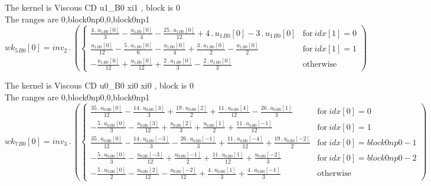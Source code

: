 \documentclass{article}
\begin{document}
\noindent The kernel is Viscous CD u1_B0 xi1 , block is 0\\\noindent The ranges are 0,block0np0,0,block0np1\\\begin{dmath}{wk_{5}{_{B0}}}[{0}] = inv_2 \,.\, \left(\begin{cases} \frac{4 \,.\, {u_{1}{_{B0}}}[{0}]}{3} - \frac{{u_{1}{_{B0}}}[{0}]}{4} - \frac{25 \,.\, {u_{1}{_{B0}}}[{0}]}{12} + 4 \,.\, {u_{1}{_{B0}}}[{0}] - 3 \,.\, {u_{1}{_{B0}}}[{0}] & 
\text{for}\: {idx}[{1}] = 0 \\\frac{{u_{1}{_{B0}}}[{0}]}{12} - \frac{5 \,.\, {u_{1}{_{B0}}}[{0}]}{6} - \frac{{u_{1}{_{B0}}}[{0}]}{4} + \frac{3 \,.\, {u_{1}{_{B0}}}[{0}]}{2} - \frac{{u_{1}{_{B0}}}[{0}]}{2} & \text{for}\: {idx}[{1}] = 1 \\- 
\frac{{u_{1}{_{B0}}}[{0}]}{12} + \frac{{u_{1}{_{B0}}}[{0}]}{12} + \frac{2 \,.\, {u_{1}{_{B0}}}[{0}]}{3} - \frac{2 \,.\, {u_{1}{_{B0}}}[{0}]}{3} & \text{otherwise} \end{cases}\right)\end{dmath}

\noindent The kernel is Viscous CD u0_B0 xi0 xi0 , block is 0\\\noindent The ranges are 0,block0np0,0,block0np1\\\begin{dmath}{wk_{7}{_{B0}}}[{0}] = inv_3 \,.\, \left(\begin{cases} \frac{35 \,.\, {u_{0}{_{B0}}}[{0}]}{12} - \frac{14 \,.\, {u_{0}{_{B0}}}[{3}]}{3} + \frac{19 \,.\, {u_{0}{_{B0}}}[{2}]}{2} + \frac{11 \,.\, {u_{0}{_{B0}}}[{4}]}{12} - \frac{26 \,.\, 
{u_{0}{_{B0}}}[{1}]}{3} & \text{for}\: {idx}[{0}] = 0 \\- \frac{5 \,.\, {u_{0}{_{B0}}}[{0}]}{3} - \frac{{u_{0}{_{B0}}}[{3}]}{12} + \frac{{u_{0}{_{B0}}}[{2}]}{3} + \frac{{u_{0}{_{B0}}}[{1}]}{2} + \frac{11 \,.\, {u_{0}{_{B0}}}[{-1}]}{12} & \text{for}\: 
{idx}[{0}] = 1 \\\frac{35 \,.\, {u_{0}{_{B0}}}[{0}]}{12} - \frac{14 \,.\, {u_{0}{_{B0}}}[{-3}]}{3} - \frac{26 \,.\, {u_{0}{_{B0}}}[{-1}]}{3} + \frac{11 \,.\, {u_{0}{_{B0}}}[{-4}]}{12} + \frac{19 \,.\, {u_{0}{_{B0}}}[{-2}]}{2} & \text{for}\: 
{idx}[{0}] = block0np0 - 1 \\- \frac{5 \,.\, {u_{0}{_{B0}}}[{0}]}{3} - \frac{{u_{0}{_{B0}}}[{-3}]}{12} + \frac{{u_{0}{_{B0}}}[{-1}]}{2} + \frac{11 \,.\, {u_{0}{_{B0}}}[{1}]}{12} + \frac{{u_{0}{_{B0}}}[{-2}]}{3} & \text{for}\: {idx}[{0}] = block0np0 - 
2 \\- \frac{5 \,.\, {u_{0}{_{B0}}}[{0}]}{2} - \frac{{u_{0}{_{B0}}}[{2}]}{12} - \frac{{u_{0}{_{B0}}}[{-2}]}{12} + \frac{4 \,.\, {u_{0}{_{B0}}}[{1}]}{3} + \frac{4 \,.\, {u_{0}{_{B0}}}[{-1}]}{3} & \text{otherwise} \end{cases}\right)\end{dmath}
\end{document}
